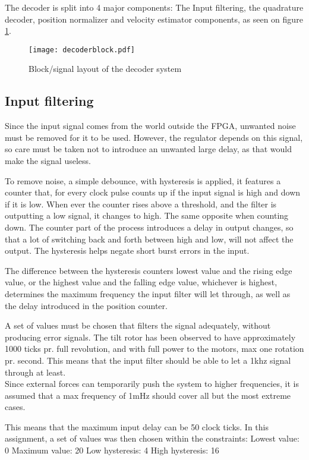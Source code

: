 The decoder is split into 4 major components: The Input filtering, the quadrature decoder, position normalizer and velocity estimator components, as seen on figure \ref{fig:decoderblock}. 



\begin{figure}[htb]
\texttt{[image: decoderblock.pdf]}
\caption{Block/signal layout of the decoder system}
\label{fig:decoderblock}
\end{figure}


\subsection{Input filtering}
Since the input signal comes from the world outside the FPGA, unwanted noise must be removed for it to be used. However, the regulator depends on this signal, so care must be taken not to introduce an unwanted large delay, as that would make the signal  useless.

To remove noise, a simple debounce, with hysteresis is applied, it features a counter that, for every clock pulse counts up if the input signal is high and down if it is low.
When ever the counter rises above a threshold, and the filter is outputting a low signal, it changes to high. The same opposite when counting down.
The counter part of the process introduces a delay in output changes, so that a lot of switching back and forth between high and low, will not affect the output. The hysteresis helps negate short burst errors in the input. 

The difference between the hysteresis counters lowest value and the rising edge value, or the highest value and the falling edge value, whichever is highest, determines the maximum frequency the input filter will let through, as well as the delay introduced in the position counter.

A set of values must be chosen that filters the signal adequately, without producing error signals. The tilt rotor has been observed to have approximately 1000 ticks pr. full revolution, and with full power to the motors, max one rotation pr. second.
This means that the input filter should be able to let a 1khz signal through at least. \\ 
Since external forces can temporarily push the system to higher frequencies, it is assumed that a max frequency of 1mHz should cover all but the most extreme cases.

This means that the maximum input delay can be 50 clock ticks.
In this assignment, a set of values was then chosen within the constraints: 
Lowest value: 0
Maximum value: 20
Low hysteresis: 4
High hysteresis: 16

